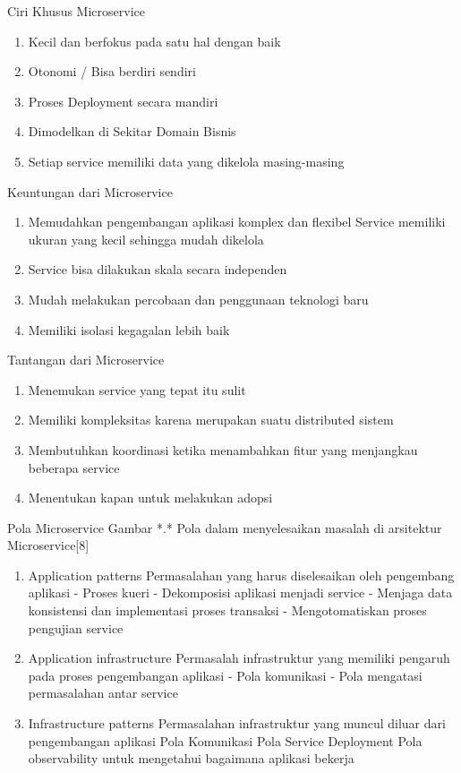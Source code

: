 Ciri Khusus Microservice	
\begin{enumerate}[leftmargin=1.3cm]
	\item Kecil dan berfokus pada satu hal dengan baik
	\item Otonomi / Bisa berdiri sendiri
	\item Proses Deployment  secara mandiri
	\item Dimodelkan di Sekitar Domain Bisnis
	\item Setiap service memiliki data yang dikelola masing-masing
\end{enumerate}	

Keuntungan dari Microservice
\begin{enumerate}[leftmargin=1.3cm]
	\item Memudahkan pengembangan aplikasi komplex dan flexibel Service memiliki ukuran yang kecil sehingga mudah dikelola
	\item Service bisa dilakukan skala secara independen 
	\item Mudah melakukan percobaan dan penggunaan teknologi baru
	\item Memiliki isolasi kegagalan lebih baik
\end{enumerate}	

Tantangan dari Microservice
\begin{enumerate}[leftmargin=1.3cm]
	\item Menemukan service yang tepat itu sulit
	\item Memiliki kompleksitas karena merupakan suatu distributed sistem
	\item Membutuhkan koordinasi ketika menambahkan fitur yang menjangkau beberapa service
	\item Menentukan kapan untuk melakukan adopsi
\end{enumerate}	

Pola Microservice
Gambar *.* Pola dalam menyelesaikan masalah di arsitektur Microservice[8]
\begin{enumerate}[leftmargin=1.3cm]
	\item Application patterns
	Permasalahan yang harus diselesaikan oleh pengembang aplikasi
	- Proses kueri
	- Dekomposisi aplikasi menjadi service
	- Menjaga data konsistensi dan implementasi proses transaksi
	- Mengotomatiskan proses pengujian  service
	\item Application infrastructure 
	Permasalah infrastruktur yang memiliki pengaruh pada proses pengembangan aplikasi
	- Pola komunikasi
	- Pola mengatasi permasalahan antar service
	\item Infrastructure patterns 
	Permasalahan infrastruktur yang muncul diluar dari pengembangan aplikasi
	Pola Komunikasi
	Pola Service Deployment
	Pola observability untuk mengetahui bagaimana aplikasi bekerja	
\end{enumerate}	

